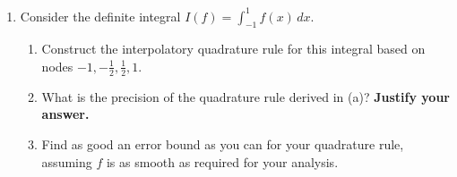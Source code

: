 \documentclass{article}
\newtheorem*{theorem}{Theorem}
\begin{document}
\begin{enumerate}
\begin{enumerate}
            Since the Chebyshev polynomial is infact a polynomial, with coefficient $2^{k-1}$, we can write it out as $2^{k-1}(x-x_1)(x-x_2)\cdots(x-x_k)$, where $x_i,\, 1\leq i \leq k$ are the roots of $x_i$. It can also be converted to a monic polyomial by dividing by $2^{k-1}$. Note that it is also bound between -1 and 1 because of the $\cos$ definition of $T_k$ To show that they are optimal, we prove the following:
            \begin{theorem}
                If W(x) is a monic polynomial of degree $\leq k$, then $\displaystyle \max_{x} |W(x)| \geq \max_{x} \Big| \frac{T_k(x)}{2^{k-1}}\Big| = \frac{1}{2^{k-1}}$
            \end{theorem}
            \begin{proof}
                Suppose $\displaystyle \max_{x} |W(x)| < \max_{x} \Big| \frac{T_k(x)}{2^{k-1}}\Big|$, then in particular $|W(y_i)| < \Big| \frac{T_k(y_i)}{2^{k-1}}\Big| = \frac{1}{2^{k-1}}$ where $y_i = \cos(\frac{i\pi}{k})$ since looking at the definition of $T_k$ these are the absolute maximums, specifically
                \[
                    T_k(y_i) =
                    \begin{cases}
                        & 1 & i \text{ even} \\
                        &-1 & i \text{ odd} \\
                    \end{cases}
                \]
            \end{proof}
        \end{enumerate}
    \newpage
    \item Consider the definite integral $I(f) = \int_{-1}^1 f(x) \,dx$.

        \begin{enumerate}
            \item Construct the interpolatory quadrature rule for this integral based on nodes $-1, -\frac{1}{2}, \frac{1}{2}, 1$.
            \item What is the precision of the quadrature rule derived in (a)? \textbf{Justify your answer.}
            \item Find as good an error bound as you can for your quadrature rule, assuming $f$ is as smooth as required for your analysis.
        \end{enumerate}
\end{enumerate}
\end{document}
